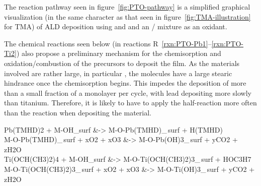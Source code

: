 The reaction pathway seen in figure~\vref{fig:PTO-pathway} is a simplified graphical visualization (in the same character as that seen in figure~\vref{fig:TMA-illustration} for TMA) of ALD deposition using \TMHD{} and \TiOiPr{} and an / mixture as an oxidant.  

The chemical reactions seen below (in reactions R~\ref{rxn:PTO-Pb1}--\ref{rxn:PTO-Ti2}) also propose a preliminary mechanism for the chemisorption and oxidation/combustion of the precursors to deposit the film. As the materials involved are rather large, in particular \TMHD{}, the molecules have a large stearic hindrance once the chemisorption begins. This impedes the deposition of more than a small fraction of a monolayer per cycle, with lead depositing more slowly than titanium. Therefore, it is likely to have to apply the \TMHD{} half-reaction more often than the \TiOiPr{} reaction when depositing the material. 

{\small \addtocounter{reaction}{-2} \onehalfspacing
\begin{reactions}
	Pb(TMHD)2 + M-OH_{surf} &-> M-O-Pb(TMHD)_{\,surf} + H(TMHD) \label{rxn:PTO-Pb1}%
		\\
	M-O-Pb(TMHD)_{\,surf} + xO2 + xO3 &-> M-O-Pb(OH)3_{\,surf} + yCO2 + zH2O \label{rxn:PTO-Pb2}%
		\\
	Ti(OCH(CH3)2)4 + M-OH_{surf} &-> M-O-Ti(OCH(CH3)2)3_{\,surf} + HOC3H7 \label{rxn:PTO-Ti1}%
		\\
	M-O-Ti(OCH(CH3)2)3_{\,surf} + xO2 + xO3 &-> M-O-Ti(OH)3_{\,surf} + yCO2 + zH2O \label{rxn:PTO-Ti2}%
\end{reactions}
}

